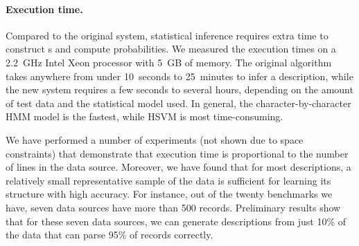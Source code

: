 \paragraph*{Execution time.}
Compared to the original system, 
statistical inference requires extra time to construct \seqset{}s and
compute probabilities. 
We measured the execution times on a 2.2~GHz Intel Xeon processor with
5~GB of memory. The original algorithm takes anywhere from 
under 10~seconds to 25~minutes to infer a description, while the new system
requires a few seconds to several hours, depending on the amount of test data
and the statistical model used. In general, the character-by-character
HMM model is the fastest, while HSVM is most time-consuming.

We have performed a number of experiments (not shown due to space 
constraints) that demonstrate that execution time is proportional
to the number of lines in the data source.  Moreover, we have
found that for most descriptions, a relatively small representative
sample of the data is sufficient for learning its structure with
high accuracy.
For instance, out of the twenty benchmarks we have, seven data sources
have more than 500 records.  Preliminary results show that for these
seven data sources, we can generate descriptions from just 10\% 
of the data that can parse 95\% of records correctly.

